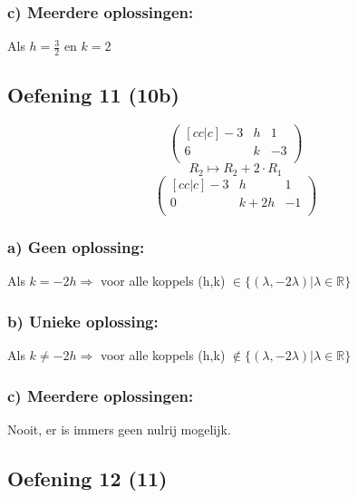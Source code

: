 \documentclass[lineaire_algebra_oplossingen.tex]{subfiles}
\begin{document}
\subsubsection*{c) Meerdere oplossingen:}
Als $h = \frac{3}{2}$ en $k = 2$

\subsection{Oefening 11 (10b)}
\[
\begin{pmatrix}[cc|c]
-3 &  h &  1\\
6 &  k &  -3\\
\end{pmatrix}
\]
\[R_2 \longmapsto R_2 + 2\cdot R_1\]
\[
\begin{pmatrix}[cc|c]
-3 &  h &  1\\
0 &  k+2h &  -1\\
\end{pmatrix}
\]
\subsubsection*{a) Geen oplossing:}
Als $k = -2h \Rightarrow$ voor alle koppels (h,k) $\in \{(\lambda, -2\lambda)| \lambda \in \mathbb{R}\}$
\subsubsection*{b) Unieke oplossing:}
Als $k \neq -2h \Rightarrow$ voor alle koppels (h,k) $\not \in \{(\lambda, -2\lambda)| \lambda \in \mathbb{R}\}$
\subsubsection*{c) Meerdere oplossingen:}
Nooit, er is immers geen nulrij mogelijk.

\subsection{Oefening 12 (11)}
\end{document}
